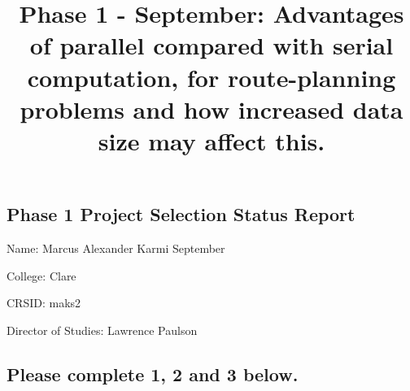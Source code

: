\documentclass{article}
\title{Phase 1 - September: Advantages of parallel compared with serial computation, for route-planning problems and how increased data size may affect this.}
\begin{document}
\maketitle

\subsection*{ Phase 1 Project Selection Status Report}

Name: Marcus Alexander Karmi September

College: Clare

CRSID: maks2

Director of Studies: Lawrence Paulson

\subsection*{Please complete 1, 2 and 3 below.}
\end{document}
